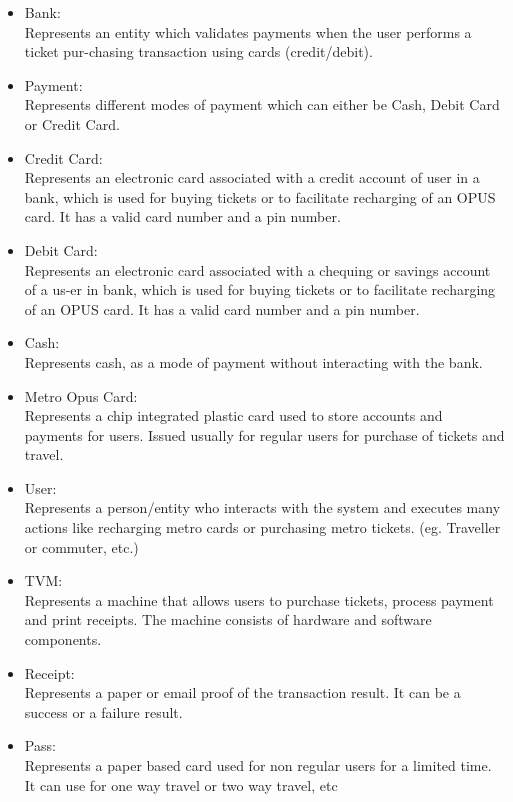 \documentclass[11pt,oneside]{book}
\begin{document}
\begin{itemize}
\item Bank: \\ Represents an entity which validates payments when the user performs a ticket pur-chasing transaction using cards (credit/debit). 

\item Payment:\\ 
 Represents different modes of payment which can either be Cash, Debit Card or Credit Card.

\item Credit Card: \\
Represents an electronic card associated with a credit account of user in a bank, which is used for buying tickets or to facilitate recharging of an OPUS card. It has a valid card number and a pin number. 

\item Debit Card: \\
 Represents an electronic card associated with a chequing or savings account of a us-er in bank, which is used for buying tickets or to facilitate recharging of an OPUS card. It has a valid card number and a pin number. 

\item Cash:\\
Represents cash, as a mode of payment without interacting with the bank. 

\item Metro Opus Card:\\
 Represents a chip integrated plastic card used to store accounts and payments for users. Issued usually for regular users for purchase of tickets and travel. 

\item User:\\
 Represents a person/entity who interacts with the system and executes many actions like recharging metro cards or purchasing metro tickets. (eg. Traveller or commuter, etc.)

\item TVM: \\
Represents a machine that allows users to purchase tickets, process payment 
and print receipts. The machine consists of hardware and software components. 

\item Receipt: \\ 
 Represents a paper or email proof of the transaction result. It can be a success 
or a failure result.

\item Pass: \\
 Represents a paper based card used for non regular users for a limited time. 
It can use for one way travel or two way travel, etc



\end{itemize}
\end{document}
